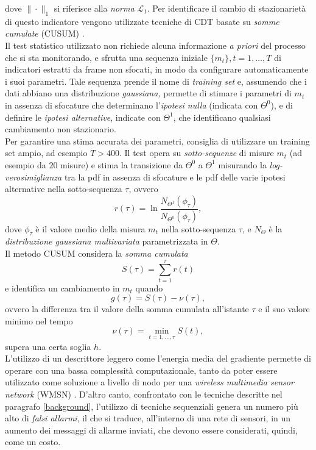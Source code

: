dove $\| \cdot \|_1$ si riferisce alla \textit{norma} $\mathcal{L}_1$. 
Per identificare il cambio di stazionariet\`a di questo indicatore vengono utilizzate tecniche di CDT basate su \textit{somme cumulate} (CUSUM) \cite{alippi2008just}.\\
Il test statistico utilizzato non richiede alcuna informazione \textit{a priori} del processo che si sta monitorando, e sfrutta una sequenza iniziale $\{m_t\}, t=1,\dots,T$ di indicatori estratti da frame non sfocati, in modo da configurare automaticamente i suoi parametri. 
Tale sequenza prende il nome di \textit{training set} e, assumendo che i dati abbiano una distribuzione \textit{gaussiana,} permette di stimare i parametri di $m_t$ in assenza di sfocature che determinano l'\textit{ipotesi nulla} (indicata con $\Theta^0$), e di definire le \textit{ipotesi alternative}, indicate con $\Theta^1$, che identificano qualsiasi cambiamento non stazionario.\\
Per garantire una stima accurata dei parametri, \cite{alippi2010detecting} consiglia di utilizzare un training set ampio, ad esempio $T > 400$.
Il test opera su \textit{sotto-sequenze} di misure $m_t$ (ad esempio da $20$ misure) e stima la transizione da $\Theta^0$ a $\Theta^1$ misurando la \textit{log-verosimiglianza} tra la pdf in assenza di sfocature e le pdf delle varie ipotesi alternative nella sotto-sequenza $\tau$, ovvero
\[ r(\tau) = \ln \frac{N_{\Theta^1}(\phi_{\tau})}{N_{\Theta^0}(\phi_{\tau})}, \]
dove $\phi_{\tau}$ \`e il valore medio della misura $m_t$ nella sotto-sequenza $\tau$, e $N_{\Theta}$ \`e la \textit{distribuzione gaussiana multivariata} parametrizzata in $\Theta$.\\
Il metodo CUSUM considera la \textit{somma cumulata} 
\[ S(\tau) = \sum^\tau_{t=1} r(t) \]
e identifica un cambiamento in $m_t$ quando \[g(\tau)=S(\tau)-\nu(\tau),\] ovvero la differenza tra il valore della somma cumulata all'istante $\tau$ e il suo valore minimo nel tempo \[\nu(\tau)=\min_{t=1,...,\tau}S(t),\] supera una certa soglia $h$.\\
L'utilizzo di un descrittore leggero come l'energia media del gradiente permette di operare con una bassa complessit\`a computazionale, tanto da poter essere utilizzato come soluzione a livello di nodo per una \textit{wireless multimedia sensor network} (WMSN) \cite{akyildiz2007survey}.
D'altro canto, confrontato con le tecniche descritte nel paragrafo \ref{background}, l'utilizzo di tecniche sequenziali genera un numero pi\`u alto di \textit{falsi allarmi}, il che si traduce, all'interno di una rete di sensori, in un aumento dei messaggi di allarme inviati, che devono essere considerati, quindi, come un costo.